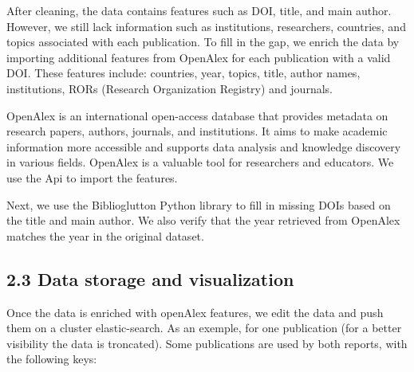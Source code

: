 \documentclass[
]{article}
\begin{document}
After cleaning, the data contains features such as DOI, title, and main
author. However, we still lack information such as institutions,
researchers, countries, and topics associated with each publication. To
fill in the gap, we enrich the data by importing additional features
from OpenAlex for each publication with a valid DOI. These features
include: countries, year, topics, title, author names, institutions,
RORs (Research Organization Registry) and journals.

OpenAlex is an international open-access database that provides metadata
on research papers, authors, journals, and institutions. It aims to make
academic information more accessible and supports data analysis and
knowledge discovery in various fields. OpenAlex is a valuable tool for
researchers and educators. We use the Api to import the features.

Next, we use the Biblioglutton Python library to fill in missing DOIs
based on the title and main author. We also verify that the year
retrieved from OpenAlex matches the year in the original dataset.

\hypertarget{data-storage-and-visualization}{%
\subsection{2.3 Data storage and
visualization}\label{data-storage-and-visualization}}

Once the data is enriched with openAlex features, we edit the data and
push them on a cluster elastic-search. As an exemple, for one
publication (for a better visibility the data is troncated). Some
publications are used by both reports, with the following keys:
\end{document}
